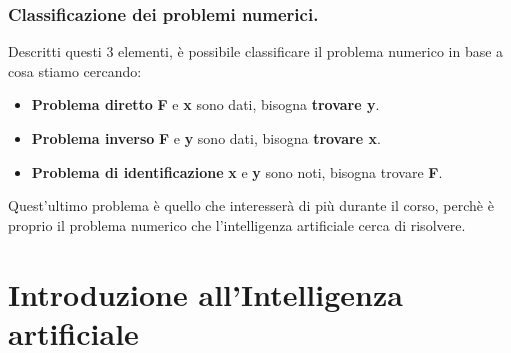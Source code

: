 \subsubsection{Classificazione dei problemi numerici.} Descritti questi 
%
3 elementi, è possibile classificare il problema numerico in base a 
%
cosa stiamo cercando:
\begin{itemize}
    \item \textbf{Problema diretto} \textbf{F} e \textbf{x} sono dati,
%
    bisogna \textbf{trovare y}.
    \item \textbf{Problema inverso} \textbf{F} e \textbf{y} sono dati,
%
    bisogna \textbf{trovare x}.
    \item \textbf{Problema di identificazione} \textbf{x} e \textbf{y} sono noti,
%
    bisogna trovare \textbf{F}.
\end{itemize}
Quest’ultimo problema è quello che interesserà di più durante il corso, 
%
perchè è proprio il problema numerico che l’intelligenza artificiale
%
cerca di risolvere.

\newpage
\section{Introduzione all'Intelligenza artificiale}


